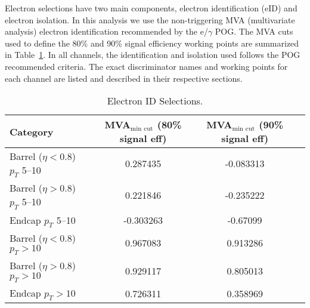 Electron selections have two main components, electron  identification (eID) and electron isolation. 
In this analysis we use the non-triggering MVA (multivariate analysis) electron identification recommended by the e/$\gamma$ POG. 
The MVA cuts used to define the 80\% and 90\% signal efficiency working points are summarized in Table~\ref{eIDtable}. 
In all channels, the identification and isolation used follows the POG recommended criteria. 
The exact discriminator names and working points for each channel are listed and described in their respective sections.

\begin{table}[ht]
\begin{center}
 \caption{Electron ID Selections.\label{eIDtable}}
 \begin{tabular}{| l | c | c | c |}
 \hline\hline
       Category                              & MVA$_{\textrm{min cut}}$ (80\% signal eff)	& MVA$_{\textrm{min cut}}$ (90\% signal eff)  \\[0.5ex] \hline
       Barrel ($\eta < 0.8$) $p_{T}$ 5--10           	& 0.287435 & -0.083313             	\\
       Barrel ($\eta > 0.8$) $p_{T}$ 5--10           	& 0.221846 & -0.235222             	\\
       Endcap $p_{T}$ 5--10           			& -0.303263 & -0.67099             	\\
       Barrel ($\eta < 0.8$) $p_{T}>10$            	& 0.967083 & 0.913286             	\\
       Barrel ($\eta > 0.8$) $p_{T}>10$            	& 0.929117 & 0.805013             	\\
       Endcap $p_{T}>10$          		  	& 0.726311 & 0.358969             	\\
 \hline
 \hline
 \end{tabular}
\end{center}
\end{table}
